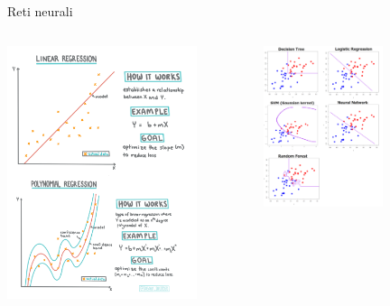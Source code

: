 \documentclass[11pt]{beamer}
\begin{document}
\begin{frame}{Reti neurali \cite{pml1Book,pml2Book,classification,regression}}


\begin{columns}
\begin{column}{0.5\textwidth}
\begin{center}
\includegraphics[width=0.8\textwidth]{Pic/regression.png}
\end{center}
\end{column}
\begin{column}{0.4\textwidth}  
\begin{center}
\includegraphics[width=0.6\textwidth]{Pic/classification.png}

\end{center}
\end{column}
\end{columns}
\end{frame}
\end{document}
